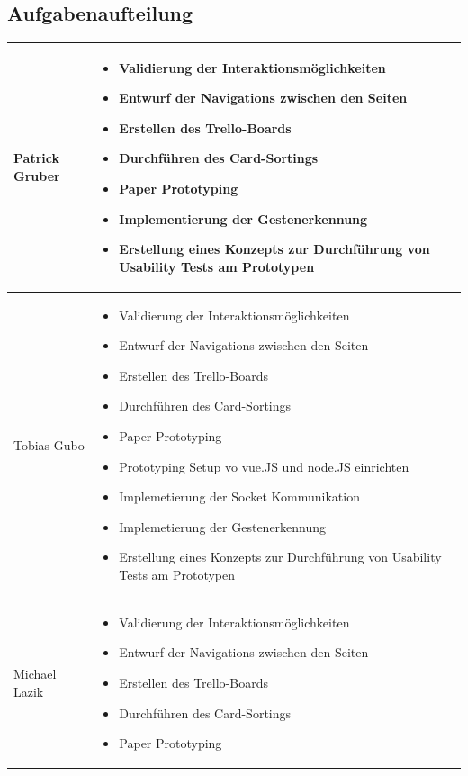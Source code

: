 \documentclass[12pt, a4paper]{scrartcl}
\begin{document}
	\subsection*{Aufgabenaufteilung}
	\begin{tabularx}{0.95\textwidth}{|l|X|}
		\hline
		Patrick Gruber & 
		\begin{itemize}
			\setlength{\itemsep}{-0.5em}
			\item  Validierung der Interaktionsmöglichkeiten
			\item  Entwurf der Navigations zwischen den Seiten
			\item Erstellen des Trello-Boards
			\item Durchführen des Card-Sortings
			\item Paper Prototyping
			\item Implementierung der Gestenerkennung
			\item Erstellung eines Konzepts zur Durchführung von Usability Tests am Prototypen
		\end{itemize}\\
		\hline
		Tobias Gubo & \begin{itemize}
			\setlength{\itemsep}{-0.5em}
			\item  Validierung der Interaktionsmöglichkeiten
			\item  Entwurf der Navigations zwischen den Seiten
			\item Erstellen des Trello-Boards
			\item Durchführen des Card-Sortings
			\item Paper Prototyping
			\item Prototyping Setup vo vue.JS und node.JS einrichten
			\item Implemetierung der Socket Kommunikation
			\item Implemetierung der Gestenerkennung
			\item Erstellung eines Konzepts zur Durchführung von Usability Tests am Prototypen
		\end{itemize} \\
		\hline
		Michael Lazik &  \begin{itemize}
			\setlength{\itemsep}{-0.5em}
			\item  Validierung der Interaktionsmöglichkeiten
			\item  Entwurf der Navigations zwischen den Seiten
			\item Erstellen des Trello-Boards
			\item Durchführen des Card-Sortings
			\item Paper Prototyping

\end{itemize}
\end{tabularx}
\end{document}
